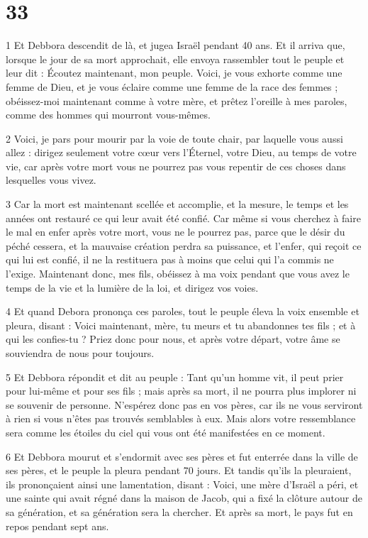 \chapter{33}

\par 1 Et Debbora descendit de là, et jugea Israël pendant 40 ans. Et il arriva que, lorsque le jour de sa mort approchait, elle envoya rassembler tout le peuple et leur dit : Écoutez maintenant, mon peuple. Voici, je vous exhorte comme une femme de Dieu, et je vous éclaire comme une femme de la race des femmes ; obéissez-moi maintenant comme à votre mère, et prêtez l'oreille à mes paroles, comme des hommes qui mourront vous-mêmes.

\par 2 Voici, je pars pour mourir par la voie de toute chair, par laquelle vous aussi allez : dirigez seulement votre cœur vers l'Éternel, votre Dieu, au temps de votre vie, car après votre mort vous ne pourrez pas vous repentir de ces choses dans lesquelles vous vivez.

\par 3 Car la mort est maintenant scellée et accomplie, et la mesure, le temps et les années ont restauré ce qui leur avait été confié. Car même si vous cherchez à faire le mal en enfer après votre mort, vous ne le pourrez pas, parce que le désir du péché cessera, et la mauvaise création perdra sa puissance, et l'enfer, qui reçoit ce qui lui est confié, il ne la restituera pas à moins que celui qui l'a commis ne l'exige. Maintenant donc, mes fils, obéissez à ma voix pendant que vous avez le temps de la vie et la lumière de la loi, et dirigez vos voies.

\par 4 Et quand Debora prononça ces paroles, tout le peuple éleva la voix ensemble et pleura, disant : Voici maintenant, mère, tu meurs et tu abandonnes tes fils ; et à qui les confies-tu ? Priez donc pour nous, et après votre départ, votre âme se souviendra de nous pour toujours.

\par 5 Et Debbora répondit et dit au peuple : Tant qu'un homme vit, il peut prier pour lui-même et pour ses fils ; mais après sa mort, il ne pourra plus implorer ni se souvenir de personne. N’espérez donc pas en vos pères, car ils ne vous serviront à rien si vous n’êtes pas trouvés semblables à eux. Mais alors votre ressemblance sera comme les étoiles du ciel qui vous ont été manifestées en ce moment.

\par 6 Et Debbora mourut et s'endormit avec ses pères et fut enterrée dans la ville de ses pères, et le peuple la pleura pendant 70 jours. Et tandis qu'ils la pleuraient, ils prononçaient ainsi une lamentation, disant : Voici, une mère d'Israël a péri, et une sainte qui avait régné dans la maison de Jacob, qui a fixé la clôture autour de sa génération, et sa génération sera la chercher. Et après sa mort, le pays fut en repos pendant sept ans.


